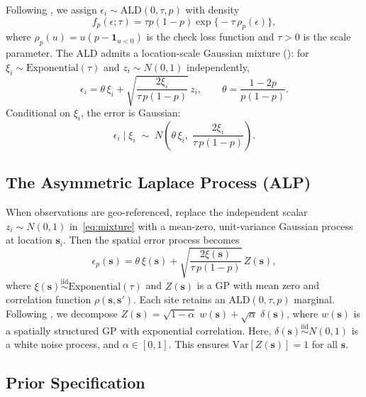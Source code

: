 \documentclass[twoside]{article}
\numberwithin{equation}{section}
\begin{document}
	Following \cite{YuMoyeed2001}, we assign
	$\epsilon_i \sim \mathrm{ALD}(0,\tau,p)$ with density
	\begin{equation*}
		f_p(\epsilon;\tau)
		= \tau p(1-p)\exp\bigl\{-\tau\,\rho_p(\epsilon)\bigr\},
	\end{equation*}
	where $\rho_p(u) = u(p - \mathbf{1}_{u<0})$ is the check loss function and $\tau>0$ is the scale parameter.
	The ALD admits a location-scale Gaussian mixture (\cite{KozumiKobayashi2011}):
	for $\xi_i \sim \mathrm{Exponential}(\tau)$ and $z_i \sim N(0,1)$
	independently,
	\begin{equation}
		\epsilon_i = \theta\,\xi_i
		+ \sqrt{\frac{2\xi_i}{\tau\,p(1-p)}}\,z_i,
		\qquad
		\theta = \frac{1-2p}{p(1-p)}.
		\label{eq:mixture}
	\end{equation}
	Conditional on $\xi_i$, the error is Gaussian:
	\begin{equation*}
		\epsilon_i \mid \xi_i
		\;\sim\;
		N\!\left(\theta\,\xi_i,\;\frac{2\xi_i}{\tau\,p(1-p)}\right).
	\end{equation*}
	
	\subsection{The Asymmetric Laplace Process (ALP)}
	
	When observations are geo-referenced, \cite{LumGelfand2012} replace the independent scalar
	$z_i \sim N(0,1)$ in~\eqref{eq:mixture} with a mean-zero,
	unit-variance Gaussian process at location $\mathbf{s}_i$. Then the spatial error
	process becomes
	\begin{equation*}
		\epsilon_p(\mathbf{s}) = \theta\,\xi(\mathbf{s}) +
		\sqrt{\frac{2\xi(\mathbf{s})}{\tau\,p(1-p)}}\,Z(\mathbf{s}),
	\end{equation*}
	where $\xi(\mathbf{s}) \stackrel{\mathrm{iid}}{\sim}
	\mathrm{Exponential}(\tau)$ and $Z(\mathbf{s})$ is a GP with mean zero and
	correlation function $\rho(\mathbf{s},\mathbf{s}')$. Each site retains an
	$\mathrm{ALD}(0,\tau,p)$ marginal.
	Following \cite{LumGelfand2012},
	we decompose $Z(\mathbf{s}) = \sqrt{1-\alpha}\;w(\mathbf{s}) +
	\sqrt{\alpha}\;\delta(\mathbf{s})$, where $w(\mathbf{s})$ is a spatially
	structured GP with exponential correlation.
	Here, $\delta(\mathbf{s}) \stackrel{\mathrm{iid}}{\sim} N(0,1)$ is a white noise process,
	and $\alpha \in [0,1]$.
	This ensures $\mathrm{Var}[Z(\mathbf{s})]=1$ for all $\mathbf{s}$.
	
	\subsection{Prior Specification}
	
\end{document}
